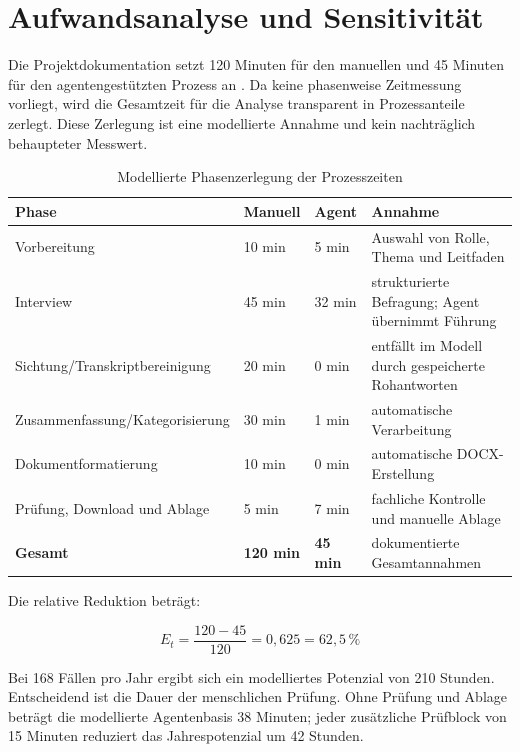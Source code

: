 \documentclass[
  10pt,
  ngerman,
  a4paper,
  toc=graduated,
  numbers=noenddot,
  headings=standardclasses
]{scrartcl}
\newcommand{\pct}[1]{#1\,\%}
\begin{document}
\section{Aufwandsanalyse und Sensitivität}

Die Projektdokumentation setzt 120 Minuten für den manuellen und 45 Minuten für den agentengestützten Prozess an \cite{sommer2026projekt}. Da keine phasenweise Zeitmessung vorliegt, wird die Gesamtzeit für die Analyse transparent in Prozessanteile zerlegt. Diese Zerlegung ist eine modellierte Annahme und kein nachträglich behaupteter Messwert.

\begin{table}[H]
\centering
\small
\begin{tabularx}{\textwidth}{Y C{2.2cm}C{2.2cm}Y}
\toprule
{}
\textbf{Phase} & \textbf{Manuell} & \textbf{Agent} & \textbf{Annahme}\\
\midrule
Vorbereitung & 10 min & 5 min & Auswahl von Rolle, Thema und Leitfaden\\
Interview & 45 min & 32 min & strukturierte Befragung; Agent übernimmt Führung\\
Sichtung/Transkriptbereinigung & 20 min & 0 min & entfällt im Modell durch gespeicherte Rohantworten\\
Zusammenfassung/Kategorisierung & 30 min & 1 min & automatische Verarbeitung\\
Dokumentformatierung & 10 min & 0 min & automatische DOCX-Erstellung\\
Prüfung, Download und Ablage & 5 min & 7 min & fachliche Kontrolle und manuelle Ablage\\
\midrule
\textbf{Gesamt} & \textbf{120 min} & \textbf{45 min} & dokumentierte Gesamtannahmen\\
\bottomrule
\end{tabularx}
\caption{Modellierte Phasenzerlegung der Prozesszeiten}
\label{tab:phasenzeit}
\end{table}

Die relative Reduktion beträgt:

\begin{equation}
E_t = \frac{120-45}{120} = 0{,}625 = \pct{62{,}5}
\end{equation}

Bei 168 Fällen pro Jahr ergibt sich ein modelliertes Potenzial von 210 Stunden. Entscheidend ist die Dauer der menschlichen Prüfung. Ohne Prüfung und Ablage beträgt die modellierte Agentenbasis 38 Minuten; jeder zusätzliche Prüfblock von 15 Minuten reduziert das Jahrespotenzial um 42 Stunden.
\end{document}
